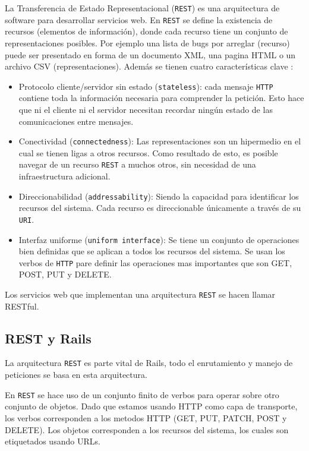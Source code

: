 La Transferencia de Estado Representacional (\texttt{REST}) es una arquitectura
de software para desarrollar servicios web. En \texttt{REST} se define la
existencia de recursos (elementos de información), donde cada recurso tiene un
conjunto de representaciones posibles. Por ejemplo una lista de bugs por arreglar
(recurso) puede ser presentado en forma de un documento XML, una pagina HTML
o un archivo CSV (representaciones). Además se tienen cuatro características
clave \cite[pag.~79]{1_richardson_2007}:

\begin{itemize}
\item Protocolo cliente/servidor sin estado (\texttt{stateless}): cada mensaje
  \texttt{HTTP} contiene toda la información necesaria para comprender la
  petición. Esto hace que ni el cliente ni el servidor necesitan recordar ningún
  estado de las comunicaciones entre mensajes.
\item Conectividad (\texttt{connectedness}): Las representaciones son un hipermedio
  en el cual se tienen ligas a otros recursos. Como resultado de esto, es posible
  navegar de un recurso \texttt{REST} a muchos otros, sin necesidad de una
  infraestructura adicional.
\item Direccionabilidad (\texttt{addressability}): Siendo la capacidad para
  identificar los recursos del sistema. Cada recurso es direccionable únicamente
  a través de su \texttt{URI}.
\item Interfaz uniforme (\texttt{uniform interface}): Se tiene un conjunto de
  operaciones bien definidas que se aplican a todos los recursos del sistema.
  Se usan los verbos de \texttt{HTTP} pare definir las operaciones mas importantes
  que son GET, POST, PUT y DELETE.
\end{itemize}

Los servicios web que implementan una arquitectura \texttt{REST} se hacen llamar
RESTful.

\subsection{REST y Rails}

La arquitectura \texttt{REST} es parte vital de Rails, todo el enrutamiento y
manejo de peticiones se basa en esta arquitectura.

En \texttt{REST} se hace uso de un conjunto finito de verbos para operar sobre otro
conjunto de objetos. Dado que estamos usando HTTP como capa de transporte, los
verbos corresponden a los metodos HTTP (GET, PUT, PATCH, POST y DELETE).
Los objetos corresponden a los recursos del sistema, los cuales son etiquetados
usando URLs.

